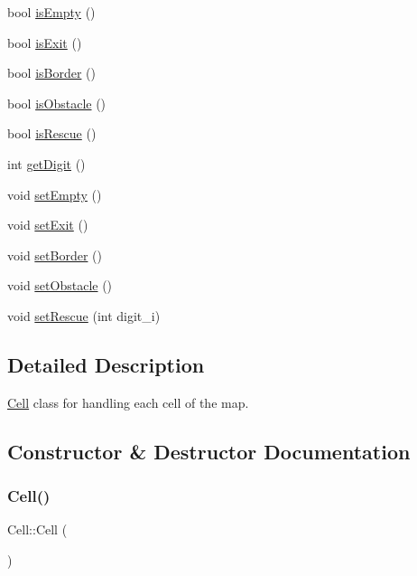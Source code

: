 \begin{DoxyCompactItemize}
\item 
bool \mbox{\hyperlink{class_cell_a6c7344ef2aa917e70364221bf86ff8bc}{is\+Empty}} ()
\item 
bool \mbox{\hyperlink{class_cell_aaf13f5d308c7f1eb670a050e4fc6dc28}{is\+Exit}} ()
\item 
bool \mbox{\hyperlink{class_cell_a34d62b7c65fd85f356bd9e2c3058edcb}{is\+Border}} ()
\item 
bool \mbox{\hyperlink{class_cell_aee32093f779b1fa761b43a6b0a86ed6c}{is\+Obstacle}} ()
\item 
bool \mbox{\hyperlink{class_cell_ad86a719c04ff04bdf79c1c0b8e5a5942}{is\+Rescue}} ()
\item 
int \mbox{\hyperlink{class_cell_a335c410074aaac9bb5594ea8adf648ff}{get\+Digit}} ()
\item 
void \mbox{\hyperlink{class_cell_a6047939b792e819bc2330151ff98864f}{set\+Empty}} ()
\item 
void \mbox{\hyperlink{class_cell_a9fa0a3c17d798320c78bffe44411008e}{set\+Exit}} ()
\item 
void \mbox{\hyperlink{class_cell_aa690e62809d36d512cd39ccda9cea293}{set\+Border}} ()
\item 
void \mbox{\hyperlink{class_cell_a34e953e7f720c3382f0b13c2480cafd0}{set\+Obstacle}} ()
\item 
void \mbox{\hyperlink{class_cell_afa194cda3c1e8f9be100c9a14fda7f9d}{set\+Rescue}} (int digit\+\_\+i)
\end{DoxyCompactItemize}


\subsection{Detailed Description}
\mbox{\hyperlink{class_cell}{Cell}} class for handling each cell of the map. 

\subsection{Constructor \& Destructor Documentation}
\mbox{\label{class_cell_a394510643e8664cf12b5efaf5cb99f71}} 
\subsubsection{\texorpdfstring{Cell()}{Cell()}}
{\footnotesize\ttfamily Cell\+::\+Cell (\begin{DoxyParamCaption}{ }\end{DoxyParamCaption})}

